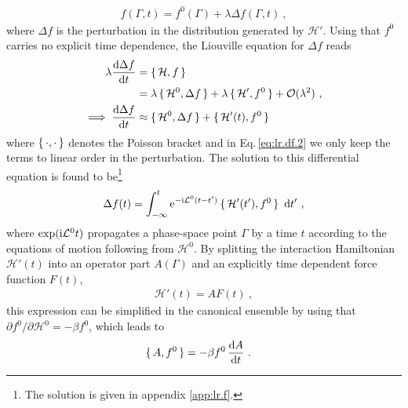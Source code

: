 \begin{align}
  f (\Gamma, t) = f^0(\Gamma) + \lambda \Delta f (\Gamma, t)~,
  \label{eq:lr.f}
\end{align}
where $\Delta f$ is the perturbation in the distribution generated by $\mathcal  H'$. Using that $f^0$ carries no explicit time dependence, the Liouville equation for $\Delta f$ reads
\begin{align}
  \lambda \frac{\d \Delta f}{\d t}
    &= \set{\mathcal  H, f} \nonumber \\
    &= \lambda \set{\mathcal H^0, \Delta f} 
      + \lambda \set{\mathcal H', f^0}
      + \mathcal{O}(\lambda^2)~,
  \label{eq:lr.df.1} \\
  \implies
    \frac{\d \Delta f}{\d t}
      &\approx \set{\mathcal H^0 , \Delta f} + \set{\mathcal H' (t), f^0}
  \label{eq:lr.df.2}
\end{align}
where $\set{\cdot , \cdot}$ denotes the Poisson bracket
and in Eq.\,\eqref{eq:lr.df.2} we only keep the terms to linear order in the perturbation.
The solution to this differential equation is found to be\footnote{The solution is given in appendix \ref{app:lr.f}.}~\cite{Kubo1957a}
\begin{align}
  \Delta f (t) 
    = \int_{-\infty}^t {\rm e}^{-\im \mathcal  L^0 (t - t')} \set{\mathcal  H' (t'), f^0}~\d t'~,
  \label{eq:lr.df(t)}
\end{align}
where $\exp ({\rm i} \mathcal  L^0 t)$ propagates a phase-space point $\Gamma$ by a time $t$ according to the equations of motion following from $\mathcal H^0$.
By splitting the interaction Hamiltonian $\mathcal H'(t)$ into an operator part $ A(\Gamma)$ and an explicitly time dependent force function $F(t)$,
\begin{align}
  \mathcal H' (t)= A F(t)~,
\end{align}
this expression can be simplified in the canonical ensemble by using that \mbox{$\partial f^0 / \partial \mathcal H^0 = -\beta f^0$}, which leads to
\begin{align*}
  \set{A, f^0}
    &= -\beta f^0 \, \frac{{\rm d} A}{{\rm d} t}~.
\end{align*}

